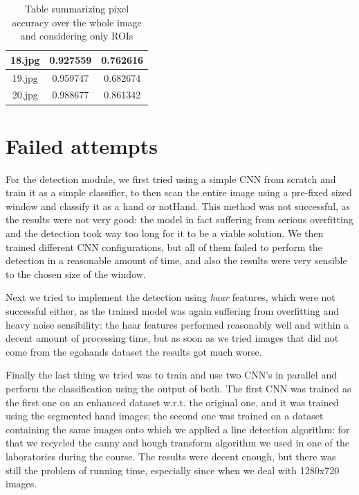 \begin{table}[h!]
\begin{tabular}{ccc}
    \multicolumn{1}{|c|}{18.jpg}                                                      & \multicolumn{1}{c|}{0.927559}                                                     & \multicolumn{1}{c|}{0.762616}                       \\ \hline
    \multicolumn{1}{|c|}{19.jpg}                                                      & \multicolumn{1}{c|}{0.959747}                                                     & \multicolumn{1}{c|}{0.682674}                       \\ \hline
    \multicolumn{1}{|c|}{20.jpg}                                                      & \multicolumn{1}{c|}{0.988677}                                                     & \multicolumn{1}{c|}{0.861342}                       \\ \hline
    \end{tabular}
    \caption{Table summarizing pixel accuracy over the whole image and considering only ROIs}
    \end{table}


\clearpage


\section{Failed attempts}

For the detection module, we first tried using a simple CNN from scratch and train it as a simple classifier, to then scan the entire image
using a pre-fixed sized window and classify it as a hand or notHand. This method was not successful, as the results were not very good: the model
in fact suffering from serious overfitting and the detection took way too long for it to be a viable solution.
We then trained different CNN configurations, but all of them failed to perform the detection in a reasonable amount of time, and also 
the results were very sensible to the chosen size of the window. 

Next we tried to implement the detection using \textit{haar} features, which were not successful either, as the trained model
was again suffering from overfitting and heavy noise sensibility: the haar features performed reasonably well and within a decent amount
of processing time, but as soon as we tried images that did not come from the egohands dataset the results got much worse.

Finally the last thing we tried was to train and use two CNN's in parallel and perform the classification using the output of both.
The first CNN was trained as the first one on an enhanced dataset w.r.t. the original one, and it was trained using the segmented hand images;
the second one was trained on a dataset containing the same images onto which we applied a line detection algorithm: for that we recycled the canny and 
hough transform algorithm we used in one of the laboratories during the course. The results were decent enough, but there was still the problem of running time,
especially since when we deal with 1280x720 images.

